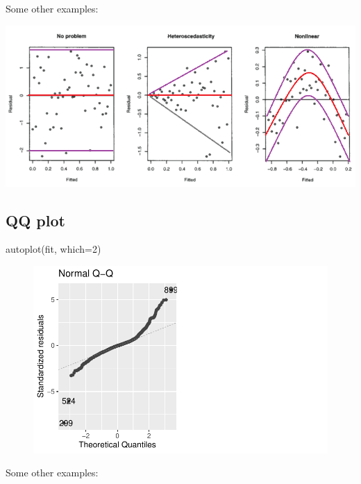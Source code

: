 \documentclass[
  letterpaper,
  DIV=11,
  numbers=noendperiod]{scrartcl}
\newenvironment{Shaded}{\begin{snugshade}}{\end{snugshade}}
\newcommand{\AttributeTok}[1]{\textcolor[rgb]{0.40,0.45,0.13}{#1}}
\newcommand{\DecValTok}[1]{\textcolor[rgb]{0.68,0.00,0.00}{#1}}
\newcommand{\FunctionTok}[1]{\textcolor[rgb]{0.28,0.35,0.67}{#1}}
\newcommand{\NormalTok}[1]{\textcolor[rgb]{0.00,0.23,0.31}{#1}}
\begin{document}
Some other examples:

\includegraphics{118_M_SLR_Notes_files/mediabag/RU17l.png}

\hypertarget{qq-plot}{%
\subsection{QQ plot}\label{qq-plot}}

\begin{Shaded}
\begin{Highlighting}[]
\FunctionTok{autoplot}\NormalTok{(fit, }\AttributeTok{which=}\DecValTok{2}\NormalTok{)}
\end{Highlighting}
\end{Shaded}

\begin{figure}[H]

{\centering \includegraphics{118_M_SLR_Notes_files/figure-pdf/unnamed-chunk-9-1.pdf}

}

\end{figure}

Some other examples:
\end{document}
